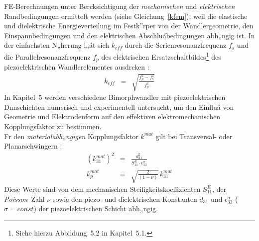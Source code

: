 FE-Berechnungen unter Bercksichtigung der {\em mechanischen} und
{\em elektrischen} Randbedingungen ermittelt werden (siehe
Gleichung~\ref{kfem}), weil die elastische und dielektrische
Energieverteilung im Festk”rper von der Wandlergeometrie, den
Einspannbedingungen und den elektrischen Abschluábedingungen abh„ngig ist.
In der einfachsten N„herung l„át sich $k_{eff}$ durch die
Serienresonanzfrequenz $f_{s}$ und die Parallelresonanzfrequenz $f_{p}$
des elektrischen Ersatzschaltbildes\footnote{Siehe hierzu Abbildung~5.2 in
Kapitel~5.1.} des piezoelektrischen Wandlerelementes
ausdrcken \cite{Ler90}:
\begin{eqnarray}
\label{keff}
 k_{eff} & = & \sqrt{ \frac{f_{p}^{2} - f_{s}^{2}}{f_{p}^{2}}}
\end{eqnarray}
In Kapitel~5 werden verschiedene Bimorphwandler mit piezoelektrischen
Dnnschichten numerisch und experimentell untersucht, um den Einfluá von
Geometrie und Elektrodenform auf den effektiven elektromechanischen
Kopplungsfaktor zu bestimmen.\\
%
Fr den {\em materialabh„ngigen} Kopplungsfaktor $k^{mat}$ gilt bei
Transversal- oder Planarschwingern \cite{VIB}:
\begin{eqnarray}
\label{kmat}
 \left( k_{31}^{mat} \right)^{2} & = &
    \displaystyle \frac{ d_{31}^{2} }{ S_{11}^{E} \cdot
                     \epsilon_{33}^{\sigma} } \\
 k_{p}^{mat} & = & \sqrt{ \frac{2}{(1 - \nu)}} \, k_{31}^{mat}
\end{eqnarray}
Diese Werte sind von dem mechanischen Steifigkeitskoeffizienten
$S_{11}^{E}$, der {\sl Poisson}--Zahl $\nu$ sowie den piezo- und
dielektrischen Konstanten $d_{31}$ und $\epsilon_{33}^{\sigma}$
($\sigma = const$) der piezoelektrischen Schicht abh„ngig.\\
%
